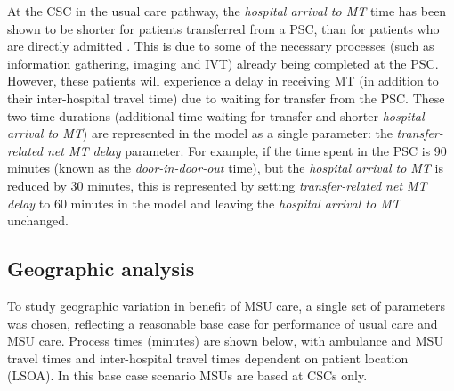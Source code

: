 At the CSC in the usual care pathway, the \emph{hospital arrival to MT} time has been shown to be shorter for patients transferred from a PSC, than for patients who are directly admitted \cite{hassan_impact_2022}. This is due to some of the necessary processes (such as information gathering, imaging and IVT) already being completed at the PSC. However, these patients will experience a delay in receiving MT (in addition to their inter-hospital travel time) due to waiting for transfer from the PSC. These two time durations (additional time waiting for transfer and shorter \emph{hospital arrival to MT}) are represented in the model as a single parameter: the \emph{transfer-related net MT delay} parameter. For example, if the time spent in the PSC is 90 minutes (known as the \textit{door-in-door-out} time), but the \textit{hospital arrival to MT} is reduced by 30 minutes, this is represented by setting \textit{transfer-related net MT delay} to 60 minutes in the model and leaving the \emph{hospital arrival to MT} unchanged.

\subsection{Geographic analysis}

To study geographic variation in benefit of MSU care, a single set of parameters was chosen, reflecting a reasonable base case for performance of usual care and MSU care. Process times (minutes) are shown below, with ambulance and MSU travel times and inter-hospital travel times dependent on patient location (LSOA). In this base case scenario MSUs are based at CSCs only. 

\vspace{5mm}

